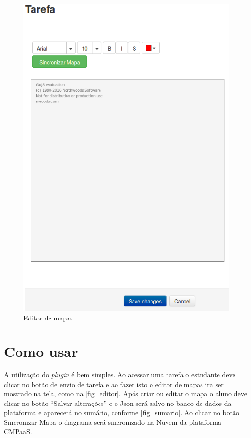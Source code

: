 \documentclass[
	12pt,				%
	openright,			%
	oneside,			%
	a4paper,			%
	english,			%
	french,				%
	spanish,			%
	brazil				%
	]{abntex2}
\begin{document}
\begin{figure}[htb]
	\caption{\label{fig_editor} Editor de mapas}
	\begin{center}
		\includegraphics[scale=0.3]{editor.png}
	\end{center}
\end{figure}

\section{Como usar}

A utilização do \textit{plugin} é bem simples. Ao acessar uma tarefa o estudante deve clicar no botão de envio de tarefa e ao fazer isto o editor de mapas ira ser mostrado na tela, como na \autoref{fig_editor}. Após criar ou editar o mapa o aluno deve clicar no botão “Salvar alterações” e o Json será salvo no banco de dados da plataforma e aparecerá no sumário, conforme \autoref{fig_sumario}. Ao clicar no botão Sincronizar Mapa o diagrama será sincronizado na Nuvem da plataforma CMPaaS.
\end{document}
